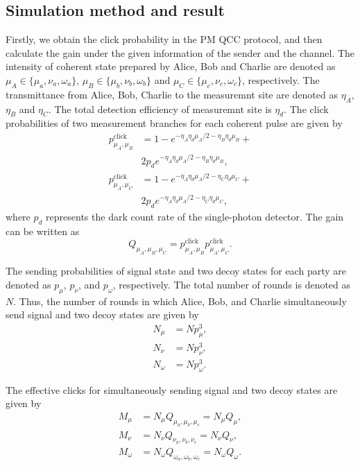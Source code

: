 \documentclass[aps,twocolumn,superscriptaddress,showpacs,nofootinbib]{revtex4-2}
\begin{document}
\subsection{Simulation method and result}\label{sec:Simulation_method_and_result}
Firstly, we obtain the click probability in the PM QCC protocol, and then calculate the gain under the given information of the sender and the channel.  The intensity of coherent state prepared by Alice, Bob and Charlie are denoted as $\mu_A\in\{\mu_a, \nu_a, \omega_a\}$, $\mu_B\in\{\mu_b, \nu_b, \omega_b\}$ and $\mu_C\in\{\mu_c, \nu_c, \omega_c\}$, respectively. The transmittance from Alice, Bob, Charlie to the measuremnt site are denoted as $\eta_{A}$, $\eta_{B}$ and $\eta_{C}$.  The total detection efficiency of measuremnt site is $\eta_d$. The click probabilities of two measurement branches for each coherent pulse are given by
\begin{equation}
\begin{split}
	p_{\mu_A,\mu_B}^\text{click} &= 1- e^{-\eta_A\eta_d \mu_A/2 - \eta_B\eta_d  \mu_B} + \\
&2 p_d e^{-\eta_A\eta_d  \mu_A/2 - \eta_B\eta_d  \mu_B}, \\
	p_{\mu_A,\mu_C}^\text{click}&= 1- e^{-\eta_A\eta_d  \mu_A/2 - \eta_C\eta_d \mu_C} + \\
&2 p_d e^{-\eta_A\eta_d \mu_A/2 - \eta_C\eta_d  \mu_C},
\end{split}
\end{equation}
where $p_d$ represents the dark count rate of the single-photon detector. The gain can be written as
\begin{equation}
	Q_{\mu_A,\mu_B,\mu_C} = p_{\mu_A,\mu_B}^\text{click} p_{\mu_A,\mu_C}^\text{click}.
\end{equation}

The sending probabilities of signal state and two decoy states for each party are denoted as $p_{\mu}$, $p_{\nu}$, and $p_{\omega}$, respectively. The total number of rounds is denoted as $N$.  Thus, the number of rounds in which Alice, Bob, and Charlie simultaneously send signal and two decoy states are given by
\begin{equation}
	\begin{split}
		N_\mu &= N p_{\mu}^3, \\
		N_\nu &= N p_{\nu}^3, \\
		N_\omega &= N p_{\omega}^3.
	\end{split}
\end{equation}

The effective clicks for simultaneously sending signal and two decoy states are given by
\begin{equation}
	\begin{split}
		M_\mu &= N_{\mu} Q_{\mu_a,\mu_b,\mu_c} =  N_{\mu} Q_{\mu},\\
		M_\nu &= N_{\nu} Q_{\nu_a,\nu_b,\nu_c} = N_{\nu} Q_{\nu}, \\
		M_\omega &= N_{\omega} Q_{\omega_a,\omega_b,\omega_c} = N_{\omega} Q_{\omega}.
	\end{split}
\end{equation}
\end{document}
